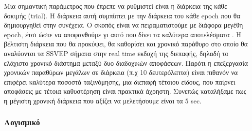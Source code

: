 \documentclass[11pt,a4paper,english,greek,twoside]{../Thesis}
\begin{document}
\par Μια σημαντική παράμετρος που έπρεπε να ρυθμιστεί είναι η διάρκεια της κάθε δοκιμής (trial). Η διάρκεια αυτή συμπίπτει με την διάρκεια του κάθε epoch που θα δημιουργηθεί στην συνέχεια. Ο σκοπός είναι να πειραματιστούμε με διάφορα μεγέθη epoch, έτσι ώστε να αποφανθούμε γι αυτό που δίνει τα καλύτερα αποτελέσματα .  Η βέλτιστη διάρκεια που θα προκύψει, θα καθορίσει και χρονικό παράθυρο στο οποίο θα αναλύονται τα SSVEP σήματα στην real time εκδοχή της διεπαφής, δηλαδή το ελάχιστο χρονικό διάστημα μεταξύ δυο διαδοχικών αποφάσεων. Παρότι η επεξεργασία χρονικών παραθύρων μεγάλων σε διάρκεια (π.χ 10 δευτερόλεπτα) είναι πιθανόν να επιφέρει καλύτερα ποσοστά ταξινόμησης, μια διεπαφή τέτοιου είδους, που παίρνει αποφάσεις με τέτοια καθυστέρηση είναι πρακτικά άχρηστη. Συνεπώς καταλήξαμε πως η μέγιστη χρονική διάρκεια που αξίζει να μελετήσουμε είναι τα 5 sec. 

\subsubsection{Λογισμικό}
\end{document}
